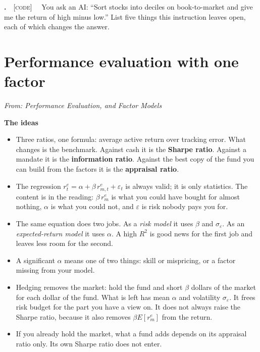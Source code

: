 \documentclass[11pt]{article}
\newcounter{ex}[section]
\renewcommand{\theex}{\thesection.\arabic{ex}}
\newenvironment{ex}[1][calculation]{\refstepcounter{ex}\par\medskip\textbf{\theex}\ \ {\small\textsc{[#1]}}\ \ }{\par}
\newcommand{\head}[1]{\par\medskip\textbf{#1}\par}
\newcommand{\re}{r^{e}}
\begin{document}
\begin{ex}[code]\label{ex:2.5}
You ask an AI: ``Sort stocks into deciles on book-to-market and give me the return of high minus low.'' List five
things this instruction leaves open, each of which changes the answer.
\end{ex}

\section{Performance evaluation with one factor}
{\small\emph{From: Performance Evaluation, and Factor Models}}

\head{The ideas}
\begin{itemize}
\item Three ratios, one formula: average active return over tracking error. What changes is the benchmark. Against cash
it is the \textbf{Sharpe ratio}. Against a mandate it is the \textbf{information ratio}. Against the best copy of the
fund you can build from the factors it is the \textbf{appraisal ratio}.
\item The regression $\re_{t} = \alpha + \beta\,\re_{m,t} + \varepsilon_{t}$ is always valid; it is only statistics. The
content is in the reading: $\beta\,\re_{m}$ is what you could have bought for almost nothing, $\alpha$ is what you could not,
and $\varepsilon$ is risk nobody pays you for.
\item The same equation does two jobs. As a \emph{risk model} it uses $\beta$ and $\sigma_{\varepsilon}$. As an
\emph{expected-return model} it uses $\alpha$. A high $R^{2}$ is good news for the first job and leaves less room for the
second.
\item A significant $\alpha$ means one of two things: skill or mispricing, or a factor missing from your model.
\item Hedging removes the market: hold the fund and short $\beta$ dollars of the market for each dollar of the fund. What
is left has mean $\alpha$ and volatility $\sigma_{\varepsilon}$. It frees risk budget for the part you have a view on. It does
not always raise the Sharpe ratio, because it also removes $\beta E[\re_{m}]$ from the return.
\item If you already hold the market, what a fund adds depends on its appraisal ratio only. Its own Sharpe ratio does not
enter.
\end{itemize}
\end{document}
